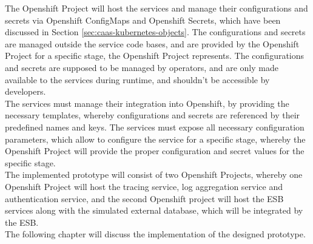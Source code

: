 The Openshift Project will host the services and manage their configurations and secrets via Openshift ConfigMaps and Openshift Secrets, which have been discussed in Section \vref{sec:caas-kubernetes-objects}. The configurations and secrets are managed outside the service code bases, and are provided by the Openshift Project for a specific stage, the Openshift Project represents. The configurations and secrets are supposed to be managed by operators, and are only made available to the services during runtime, and shouldn't be accessible by developers. \\

The services must manage their integration into Openshift, by providing the necessary templates, whereby configurations and secrets are referenced by their predefined names and keys. The services must expose all necessary configuration parameters, which allow to configure the service for a specific stage, whereby the Openshift Project will provide the proper configuration and secret values for the specific stage. \\

The implemented prototype will consist of two Openshift Projects, whereby one Openshift Project will host the tracing service, log aggregation service and authentication service, and the second Openshift project will host the ESB services along with the simulated external database, which will be integrated by the ESB. \\

The following chapter will discuss the implementation of the designed prototype. 
